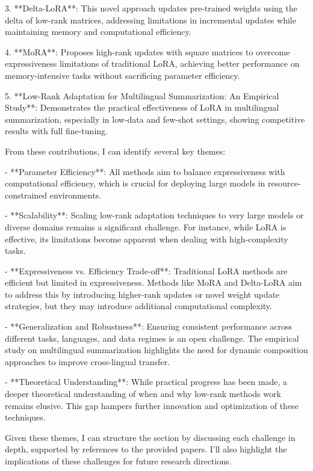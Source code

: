 \documentclass[conference]{IEEEtran}
\begin{document}
3. **Delta-LoRA**: This novel approach updates pre-trained weights using the delta of low-rank matrices, addressing limitations in incremental updates while maintaining memory and computational efficiency.

4. **MoRA**: Proposes high-rank updates with square matrices to overcome expressiveness limitations of traditional LoRA, achieving better performance on memory-intensive tasks without sacrificing parameter efficiency.

5. **Low-Rank Adaptation for Multilingual Summarization: An Empirical Study**: Demonstrates the practical effectiveness of LoRA in multilingual summarization, especially in low-data and few-shot settings, showing competitive results with full fine-tuning.

From these contributions, I can identify several key themes:

- **Parameter Efficiency**: All methods aim to balance expressiveness with computational efficiency, which is crucial for deploying large models in resource-constrained environments.
  
- **Scalability**: Scaling low-rank adaptation techniques to very large models or diverse domains remains a significant challenge. For instance, while LoRA is effective, its limitations become apparent when dealing with high-complexity tasks.

- **Expressiveness vs. Efficiency Trade-off**: Traditional LoRA methods are efficient but limited in expressiveness. Methods like MoRA and Delta-LoRA aim to address this by introducing higher-rank updates or novel weight update strategies, but they may introduce additional computational complexity.

- **Generalization and Robustness**: Ensuring consistent performance across different tasks, languages, and data regimes is an open challenge. The empirical study on multilingual summarization highlights the need for dynamic composition approaches to improve cross-lingual transfer.

- **Theoretical Understanding**: While practical progress has been made, a deeper theoretical understanding of when and why low-rank methods work remains elusive. This gap hampers further innovation and optimization of these techniques.

Given these themes, I can structure the section by discussing each challenge in depth, supported by references to the provided papers. I'll also highlight the implications of these challenges for future research directions.
\end{document}
